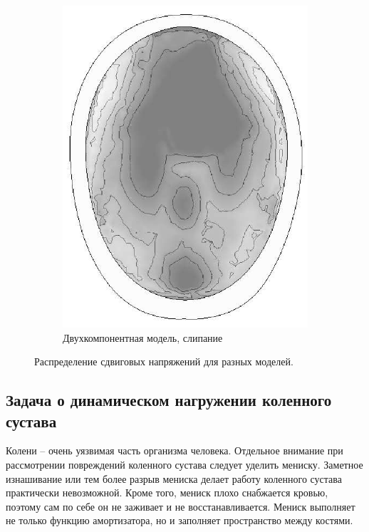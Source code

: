 \begin{figure}[h]
\begin{subfigure}[b]{0.3\textwidth}
\includegraphics[width=\textwidth]{png/cranium/2d-problem-res-6.png}
\caption{Двухкомпонентная модель, слипание}
\end{subfigure}
\caption{Распределение сдвиговых напряжений для разных моделей.}
\label{pic:cranium_2d_res_2}
\end{figure}


\clearpage
\newpage


\subsection{Задача о динамическом нагружении коленного сустава}

Колени -- очень уязвимая часть организма человека. Отдельное внимание при рассмотрении повреждений коленного сустава следует уделить мениску. Заметное изнашивание или тем более разрыв мениска делает работу коленного сустава практически невозможной. Кроме того, мениск плохо снабжается кровью, поэтому сам по себе он не заживает и не восстанавливается. Мениск выполняет не только функцию амортизатора, но и заполняет пространство между костями.

